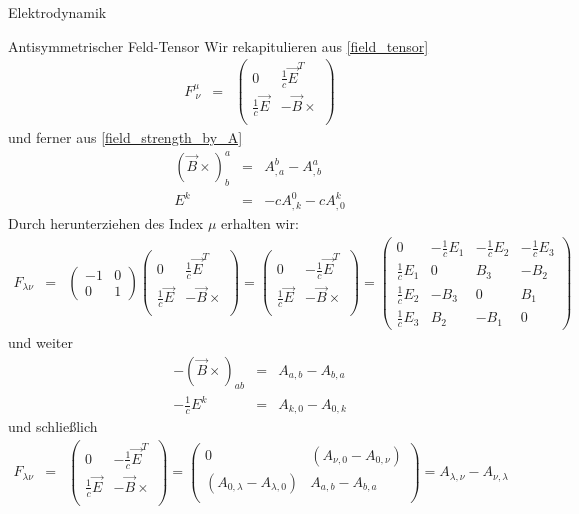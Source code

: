 \begin{chapter}{\titlestr}
\begin{section}{Elektrodynamik}
\begin{subsection}{Antisymmetrischer Feld-Tensor}
Wir rekapitulieren aus \ref{field_tensor}
\begin{eqnarray*}
F^\mu_{\ \nu} &=&
\begin{pmatrix}
0 &\frac{1}{c}\vec{E}^T\\
\frac{1}{c}\vec{E} &-\vec{B}\times\\
\end{pmatrix}
\end{eqnarray*}
und ferner aus \ref{field_strength_by_A}
\begin{eqnarray*}
\left(\vec{B}\times\right)_b^a &=&A^b_{,a}-A^a_{,b}\\
E^k &=& -cA^0_{,k}-cA^k_{,0}
\end{eqnarray*}
Durch herunterziehen des Index $\mu$ erhalten wir:
\begin{eqnarray*}
F_{\lambda \nu} &=&
\begin{pmatrix}
-1 & 0\\
0 & 1
\end{pmatrix}
\begin{pmatrix}
0 &\frac{1}{c}\vec{E}^T\\
\frac{1}{c}\vec{E} &-\vec{B}\times\\
\end{pmatrix}
=\begin{pmatrix}
0 &-\frac{1}{c}\vec{E}^T\\
\frac{1}{c}\vec{E} &-\vec{B}\times\\
\end{pmatrix}
=\begin{pmatrix}
0& -\frac{1}{c}E_1& -\frac{1}{c}E_2& -\frac{1}{c}E_3\\
\frac{1}{c}E_1& 0 & B_3 & -B_2 \\
\frac{1}{c}E_2& -B_3 & 0 & B_1 \\
\frac{1}{c}E_3& B_2 & -B_1 & 0
\end{pmatrix}
\end{eqnarray*}
und weiter
\begin{eqnarray*}
-\left(\vec{B}\times\right)_{ab} &=&A_{a,b}-A_{b,a}\\
-\frac{1}{c}E^k &=& A_{k,0}-A_{0,k}
\end{eqnarray*}
und schließlich
\begin{eqnarray*}
F_{\lambda \nu} &=&
\begin{pmatrix}
0 &-\frac{1}{c}\vec{E}^T\\
\frac{1}{c}\vec{E} &-\vec{B}\times\\
\end{pmatrix}
=
\begin{pmatrix}
0 &\left(A_{\nu,0}-A_{0,\nu}\right)\\
\left(A_{0,\lambda}-A_{\lambda,0}\right) &A_{a,b}-A_{b,a}\\
\end{pmatrix}
=A_{\lambda,\nu}-A_{\nu,\lambda}
\end{eqnarray*}
\end{subsection}


\end{section}
\end{chapter}
